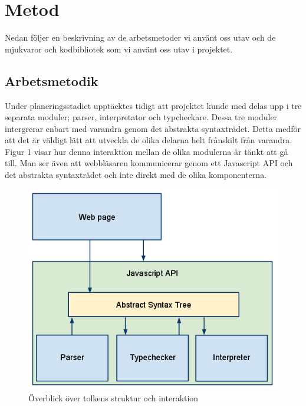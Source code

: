 \section{Metod} 

Nedan följer en beskrivning av de arbetsmetoder vi använt oss utav och de mjukvaror och kodbibliotek som vi använt oss utav i projektet. 

\subsection{Arbetsmetodik}

Under planeringsstadiet upptäcktes tidigt att projektet kunde med delas upp i tre separata moduler; parser, interpretator och typcheckare. Dessa tre moduler intergrerar enbart med varandra genom det abstrakta syntaxträdet. Detta medför att det är väldigt lätt att utveckla de olika delarna helt frånskilt från varandra. Figur 1 visar hur denna interaktion mellan de olika modulerna är tänkt att gå till. Man ser även att webbläsaren kommunicerar genom ett Javascript API och det abstrakta syntaxträdet och inte direkt med de olika komponenterna. 

\begin{figure}[H]
    \begin{center}
        \includegraphics[width=1.0\textwidth]{image1.png}
        \caption{Överblick över tolkens struktur och interaktion}
    \end{center}
\end{figure}


